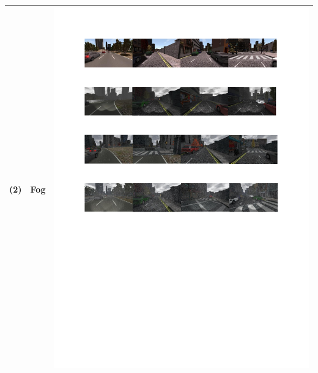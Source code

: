 \documentclass[conference]{IEEEtran}
\begin{document}
\begin{table}[!t]
\begin{tabular}{|C{1cm}|c|C{13.5cm}|}
				(2) & Fog	& \begin{minipage}{.9\textwidth}\includegraphics[scale=.8,trim=2cm 20.5cm 2cm 6.5cm,clip]{examples.pdf}\end{minipage} \\ \hline

\end{tabular}
\end{table}
\end{document}

